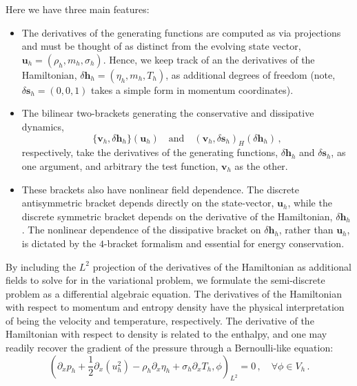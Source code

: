 Here we have three main features:

\begin{itemize}
    \item The derivatives of the generating functions are computed as via projections and must be thought of as distinct from the evolving state vector, $\bm{u}_h = (\rho_h, m_h, \sigma_h)$. Hence, we keep track of an the derivatives of the Hamiltonian, $\delta \bm{h}_h = (\eta_h, m_h, T_h)$, as additional degrees of freedom (note, $\delta \bm{s}_h = (0, 0, 1)$ takes a simple form in momentum coordinates).
    \item The bilinear two-brackets generating the conservative and dissipative dynamics,
    \begin{equation}
        \{ \bm{v}_h, \delta \bm{h}_h \} \left( \bm{u}_h \right)
        \quad \text{and} \quad
        (\bm{v}_h, \delta \bm{s}_h)_H ( \delta \bm{h}_h ) \,,
    \end{equation}
    respectively, take the derivatives of the generating functions, $\delta \bm{h}_h$ and $\delta \bm{s}_h$, as one argument, and arbitrary the test function, $\bm{v}_h$ as the other.
    \item These brackets also have nonlinear field dependence. The discrete antisymmetric bracket depends directly on the state-vector, $\bm{u}_h$, while the discrete symmetric bracket depends on the derivative of the Hamiltonian, $\delta \bm{h}_h$. The nonlinear dependence of the dissipative bracket on $\delta \bm{h}_h$, rather than $\bm{u}_h$, is dictated by the $4$-bracket formalism and essential for energy conservation.
\end{itemize}

By including the $L^2$ projection of the derivatives of the Hamiltonian as additional fields to solve for in the variational problem, we formulate the semi-discrete problem as a differential algebraic equation. The derivatives of the Hamiltonian with respect to momentum and entropy density have the physical interpretation of being the velocity and temperature, respectively. The derivative of the Hamiltonian with respect to density is related to the enthalpy, and one may readily recover the gradient of the pressure through a Bernoulli-like equation:
\begin{equation} \label{eq:proj}
    \left( \partial_x p_h + \frac{1}{2} \partial_x (u_h^2) - \rho_h \partial_x \eta_h + \sigma_h \partial_x T_h, \phi
    \right)_{L^2} = 0 \,, \quad \forall \phi \in V_h \,.
\end{equation}

